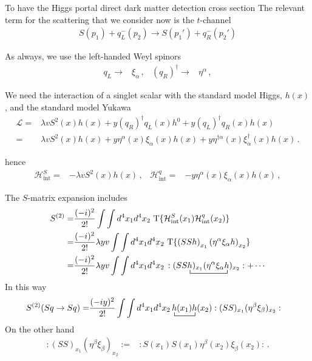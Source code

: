 To have the Higgs portal direct dark matter detection cross section
The relevant term for the scattering that we consider now is the $t$-channel
\begin{align}
  S(p_1)+q_L^{-}(p_2)\to  S(p_1')+q_R^{-}(p_2')
\end{align}

As always, we use the left-handed Weyl spinors
\begin{align}
  q_L\to &\xi_{\alpha}\,, &   \left( q_R \right)^{\dagger}\to &\eta^{\alpha}\,,
\end{align}


We need the interaction of a singlet scalar with the standard model Higgs, $h(x)$, and the standard model Yukawa
\begin{align}
  \mathcal{L}=&\lambda v S^2(x) h(x)+y \left(q_R\right)^{\dagger} q_L(x) h^0 +y \left(q_L\right)^{\dagger} q_R(x) h(x) \nonumber\\
  =&\lambda v S^2(x) h(x)+y \eta^{\alpha} (x)\xi_{\alpha}(x)h(x) + y \eta^{\dagger\dot{\alpha}}(x) \xi_{\dot{\alpha}}^{\dagger}(x)h(x)\,. 
\end{align}

hence
\begin{align}
  \mathcal{H}_{\text{int}}^{S}=&-\lambda v S^2(x) h(x)\,, &
   \mathcal{H}_{\text{int}}^{q}=&-y \eta^{\alpha} (x)\xi_{\alpha}(x)h(x)\,,
\end{align}

The $S$-matrix expansion includes
\begin{align}
S^{(2)}=&  \frac{(-i)^2}{2!}\int\int d^4x_1 d^4x_2\,\operatorname{T}\{\mathcal{H}_{\text{int}}^S(x_1)\mathcal{H}_{\text{int}}^q(x_2)\}\nonumber\\
=&  \frac{(-i)^2}{2!}\lambda y v\int\int d^4x_1 d^4x_2\,\operatorname{T}\{\left(S S h \right)_{x_1} \left( \eta^{\alpha} \xi_{\alpha}h \right)_{x_2}\}\nonumber\\
=& 
 \frac{(-i)^2}{2!}\lambda y v\int\int d^4x_1 d^4x_2\,:( S
\bcontraction{S}{h}{)_{x_1}(\eta^{\alpha} \xi_{\alpha}}{h}
S h)_{x_1}(\eta^{\alpha} \xi_{\alpha}h
)_{x_2}:+\cdots
\end{align}
In this way
\begin{align}
  S^{(2)}(S q\to S q)=&\frac{(-iy)^2}{2!}\int\int d^4x_1 d^4x_2
\bcontraction{\,}{h}{(x_1)}{h}
\,h(x_1)h(x_2):(SS)_{x_1}(\eta^{\beta} \xi_{\beta})_{x_2}:
\end{align}
On the other hand 
\begin{align}
\label{eq:ss156f}
  :(SS)_{x_1}(\eta^{\beta} \xi_{\beta})_{x_2}:=&
:S(x_1) S(x_1) \eta^{\beta}(x_2) \xi_{\beta}(x_2):\,.
\end{align}




